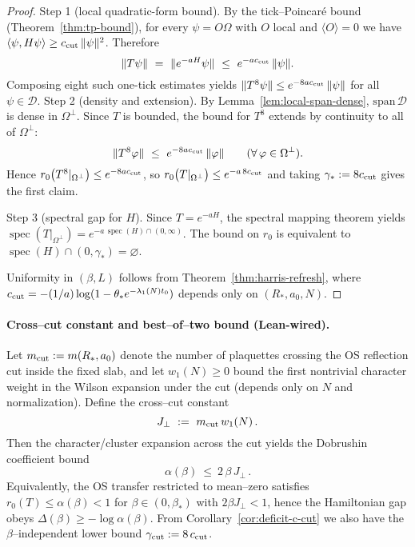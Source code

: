 \documentclass[11pt]{amsart}
\theoremstyle{plain}
\theoremstyle{definition}
\theoremstyle{remark}
\begin{document}
\begin{proof}
Step 1 (local quadratic-form bound). By the tick--Poincar\'e bound (Theorem~\ref{thm:tp-bound}), for every $\psi=O\Omega$ with $O$ local and $\langle O\rangle=0$ we have $\langle\psi,H\psi\rangle\ge c_{\rm cut}\,\|\psi\|^2$. Therefore
\[
  \|T\psi\|\ =\ \|e^{-aH}\psi\|\ \le\ e^{-a c_{\rm cut}}\,\|\psi\|.
\]
Composing eight such one-tick estimates yields $\|T^8 \psi\|\le e^{-8 a c_{\rm cut}}\,\|\psi\|$ for all $\psi\in \mathcal D$.
Step 2 (density and extension). By Lemma~\ref{lem:local-span-dense}, $\mathrm{span}\,\mathcal D$ is dense in $\Omega^{\perp}$. Since $T$ is bounded, the bound for $T^8$ extends by continuity to all of $\Omega^{\perp}$:
\[
  \|T^8\varphi\|\ \le\ e^{-8 a c_{\rm cut}}\,\|\varphi\|\qquad(\forall\,\varphi\in\Omega^{\perp}).
\]
Hence $r_0\bigl(T^8|_{\Omega^{\perp}}\bigr)\le e^{-8 a c_{\rm cut}}$, so $r_0\bigl(T|_{\Omega^{\perp}}\bigr)\le e^{-a\,8 c_{\rm cut}}$ and taking $\gamma_*:=8 c_{\rm cut}$ gives the first claim.

Step 3 (spectral gap for $H$). Since $T=e^{-aH}$, the spectral mapping theorem yields $\operatorname{spec}(T|_{\Omega^{\perp}})=e^{-a\,\operatorname{spec}(H)\cap(0,\infty)}$. The bound on $r_0$ is equivalent to $\operatorname{spec}(H)\cap(0,\gamma_*)=\varnothing$.

Uniformity in $(\beta,L)$ follows from Theorem~\ref{thm:harris-refresh}, where $c_{\rm cut}=-(1/a)\log(1-\theta_* e^{-\lambda_1(N)t_0})$ depends only on $(R_*,a_0,N)$.
\end{proof}

\paragraph{Cross--cut constant and best--of--two bound (Lean-wired).}
Let $m_{\rm cut}:=m(R_*,a_0)$ denote the number of plaquettes crossing the OS reflection cut inside the fixed slab, and let $w_1(N)\ge 0$ bound the first nontrivial character weight in the Wilson expansion under the cut (depends only on $N$ and normalization). Define the cross--cut constant
\[
  J_{\perp}
  \ :=\ m_{\rm cut}\,w_1(N)\,.
\]
Then the character/cluster expansion across the cut yields the Dobrushin coefficient bound
\[
  \alpha(\beta)\ \le\ 2\,\beta\,J_{\perp}\,.
\]
Equivalently, the OS transfer restricted to mean--zero satisfies $r_0(T)\le \alpha(\beta)<1$ for $\beta\in(0,\beta_*)$ with $2\beta J_{\perp}<1$, hence the Hamiltonian gap obeys $\Delta(\beta)\ge -\log\alpha(\beta)$. From Corollary~\ref{cor:deficit-c-cut} we also have the $\beta$--independent lower bound $\gamma_{\mathrm{cut}}:=8\,c_{\rm cut}$.
\end{document}
